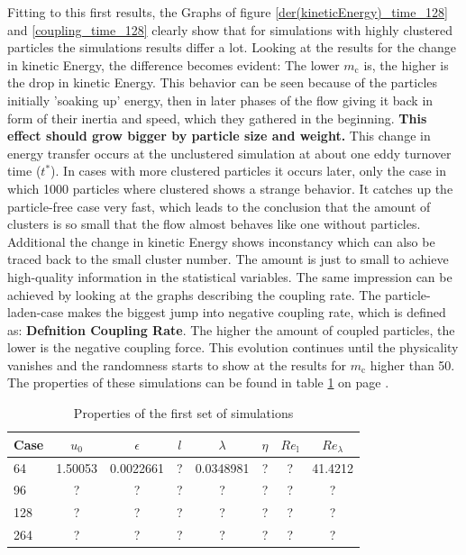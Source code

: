 \documentclass[a4paper,12pt]{article}
\numberwithin{equation}{section} %
\begin{document}
Fitting to this first results, the Graphs of figure \ref{der(kineticEnergy)_time_128} and \ref{coupling_time_128} clearly show that for simulations with highly clustered particles the simulations results differ a lot. Looking at the results for the change in kinetic Energy, the difference becomes evident: The lower $ m_\mathrm{c} $ is, the higher is the drop in kinetic Energy. This behavior can be seen because of the particles initially 'soaking up' energy, then in later phases of the flow giving it back in form of their inertia and speed, which they gathered in the beginning. \textbf{This effect should grow bigger by particle size and weight.} This change in energy transfer occurs at the unclustered simulation at about one eddy turnover time ($t^*$). In cases with more clustered particles it occurs later, only the case in which 1000 particles where clustered shows a strange behavior. It catches up the particle-free case very fast, which leads to the conclusion that the amount of clusters is so small that the flow almost behaves like one without particles. Additional the change in kinetic Energy shows inconstancy which can also be traced back to the small cluster number. The amount is just to small to achieve high-quality information in the statistical variables. 
\newline
The same impression can be achieved by looking at the graphs describing the coupling rate. The particle-laden-case makes the biggest jump into negative coupling rate, which is defined as: \textbf{Defnition Coupling Rate}. The higher the amount of coupled particles, the lower is the negative coupling force. This evolution continues until the physicality vanishes and the randomness starts to show at the results for $m_\mathrm{c}$ higher than 50. 
\newline
The properties of these simulations can be found in table \ref{table_properties} on page \pageref{table_properties}.
\begin{table}[h]
\begin{tabular}{l | c c c c c c c }
Case & $u_0$ & $\epsilon$ & $l$ & $\lambda$ & $\eta $ & $Re_\mathrm{l}$ & $Re_\lambda$ \\
\hline
\hline
64 & 1.50053 & 0.0022661 & ? & 0.0348981 & ? & ? & 41.4212 \\
96 & ? & ? & ? & ? & ? & ? & ? \\
128 & ? & ? & ? & ? & ? & ? & ?  \\
264 & ? & ? & ? & ? & ? & ? & ?  \\
\hline
\end{tabular}
\caption{Properties of the first set of simulations}
\label{table_properties}
\end{table}
\end{document}
